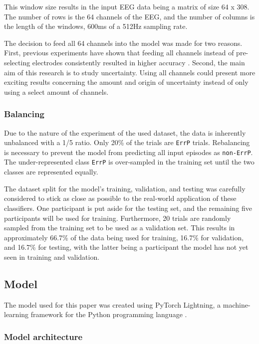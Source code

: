 This window size results in the input EEG data being a matrix of size 64 x 308. The number of rows is the 64 channels of the EEG, and the number of columns is the length of the windows, 600ms of a 512Hz sampling rate.

The decision to feed all 64 channels into the model was made for two reasons. First, previous experiments have shown that feeding all channels instead of pre-selecting electrodes consistently resulted in higher accuracy \citep{correia2021error}. Second, the main aim of this research is to study uncertainty. Using all channels could present more exciting results concerning the amount and origin of uncertainty instead of only using a select amount of channels.

\subsubsection{Balancing}

Due to the nature of the experiment of the used dataset, the data is inherently unbalanced with a 1/5 ratio. Only 20\% of the trials are \verb|ErrP| trials. Rebalancing is necessary to prevent the model from predicting all input episodes as \verb|non-ErrP|. The under-represented class \verb|ErrP| is over-sampled in the training set until the two classes are represented equally.

The dataset split for the model's training, validation, and testing was carefully considered to stick as close as possible to the real-world application of these classifiers. One participant is put aside for the testing set, and the remaining five participants will be used for training. Furthermore, 20 trials are randomly sampled from the training set to be used as a validation set. This results in approximately 66.7\% of the data being used for training, 16.7\% for validation, and 16.7\% for testing, with the latter being a participant the model has not yet seen in training and validation. 


\subsection{Model}

The model used for this paper was created using PyTorch Lightning, a machine-learning framework for the Python programming language \citep{falcon2019pytorch}.

\subsubsection{Model architecture}

